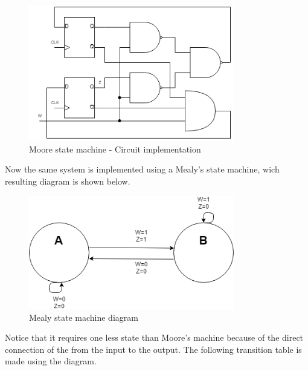 \begin{figure}[H]
    \begin{centering}
    \includegraphics[width=0.8\textwidth]{data/Graficos3/3a_Compuertas_Moore.png}
    \par\end{centering}
    \caption{Moore state machine - Circuit implementation}
\end{figure}

Now the same system is implemented using a Mealy's 
state machine, wich resulting diagram is shown below.

\begin{figure}[H]
    \begin{centering}
    \includegraphics[width=0.8\textwidth]{data/Graficos3/3b_fsm.png}
    \par\end{centering}
    \caption{Mealy state machine diagram}
\end{figure}

Notice that it requires one less state than Moore's
machine because of the direct connection of the 
from the input to the output. 
\newpage
The following 
transition table is made using the diagram.

